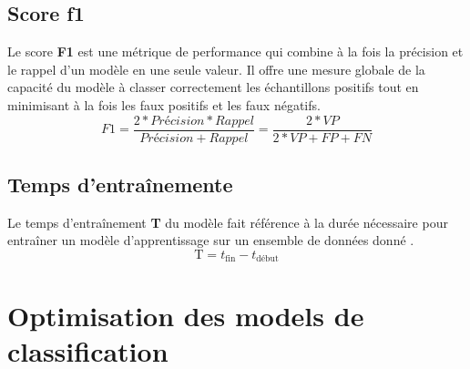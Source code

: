 \subsection{Score f1}
Le score \textbf{F1} est une métrique de performance qui combine à la fois la précision et le rappel d'un modèle en une seule valeur. Il offre une mesure globale de la capacité du modèle à classer correctement les échantillons positifs tout en minimisant à la fois les faux positifs et les faux négatifs.
\[F1 = \frac{2*Précision*Rappel}{Précision+Rappel} = \frac{2*VP}{2*VP+FP+FN}\]

\subsection{Temps d'entraînemente}
Le temps d'entraînement \textbf{T} du modèle fait référence à la durée nécessaire pour entraîner un modèle d'apprentissage sur un ensemble de données donné . 
\[ \text{T} = t_{\text{fin}} - t_{\text{début}} \]


\section{Optimisation des models de classification}
